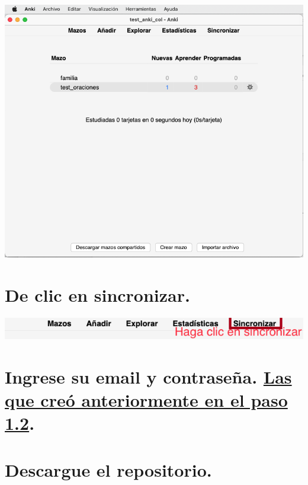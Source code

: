 \documentclass[
]{book}
\begin{document}
\includegraphics[width=1\linewidth]{images/reposit_sp/anki_screen}

\hypertarget{de-clic-en-sincronizar.}{%
\section{De clic en sincronizar.}\label{de-clic-en-sincronizar.}}

\includegraphics[width=1\linewidth]{images/reposit_sp/clic_sincronizar}

\hypertarget{ingrese-su-email-y-contraseuxf1a.-las-que-creuxf3-anteriormente-en-el-paso-1.2.}{%
\section{\texorpdfstring{Ingrese su email y contraseña. \protect\hyperlink{cross_1}{Las que creó anteriormente en el paso 1.2}.}{Ingrese su email y contraseña. Las que creó anteriormente en el paso 1.2.}}\label{ingrese-su-email-y-contraseuxf1a.-las-que-creuxf3-anteriormente-en-el-paso-1.2.}}

\hypertarget{descargue-el-repositorio.}{%
\section{Descargue el repositorio.}\label{descargue-el-repositorio.}}
\end{document}
